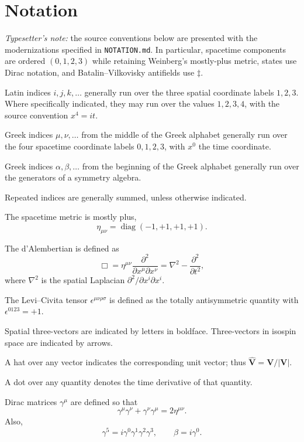 \section*{Notation}

\emph{Typesetter's note:} the source conventions below are presented with the
modernizations specified in \texttt{NOTATION.md}. In particular, spacetime
components are ordered $(0,1,2,3)$ while retaining Weinberg's mostly-plus
metric, states use Dirac notation, and Batalin--Vilkovisky antifields use
\(\ddagger\).

Latin indices \(i,j,k,\ldots\) generally run over the three spatial coordinate
labels \(1,2,3\). Where specifically indicated, they may run over the values
\(1,2,3,4\), with the source convention \(x^4=it\).

Greek indices \(\mu,\nu,\ldots\) from the middle of the Greek alphabet
generally run over the four spacetime coordinate labels \(0,1,2,3\), with
\(x^0\) the time coordinate.

Greek indices \(\alpha,\beta,\ldots\) from the beginning of the Greek alphabet
generally run over the generators of a symmetry algebra.

Repeated indices are generally summed, unless otherwise indicated.

The spacetime metric is mostly plus,
\[
  \eta_{\mu\nu}=\operatorname{diag}(-1,+1,+1,+1).
\]

The d'Alembertian is defined as
\[
  \Box=\eta^{\mu\nu}
  \frac{\partial^2}{\partial x^\mu\partial x^\nu}
  =\nabla^2-\frac{\partial^2}{\partial t^2},
\]
where \(\nabla^2\) is the spatial Laplacian
\(\partial^2/\partial x^i\partial x^i\).

The Levi--Civita tensor \(\epsilon^{\mu\nu\rho\sigma}\) is defined as the
totally antisymmetric quantity with \(\epsilon^{0123}=+1\).

Spatial three-vectors are indicated by letters in boldface. Three-vectors in
isospin space are indicated by arrows.

A hat over any vector indicates the corresponding unit vector; thus
\(\widehat{\mathbf V}=\mathbf V/\lvert\mathbf V\rvert\).

A dot over any quantity denotes the time derivative of that quantity.

Dirac matrices \(\gamma^\mu\) are defined so that
\[
  \gamma^\mu\gamma^\nu+\gamma^\nu\gamma^\mu=2\eta^{\mu\nu}.
\]
Also,
\[
  \gamma^5=i\gamma^0\gamma^1\gamma^2\gamma^3,
  \qquad
  \beta=i\gamma^0.
\]

